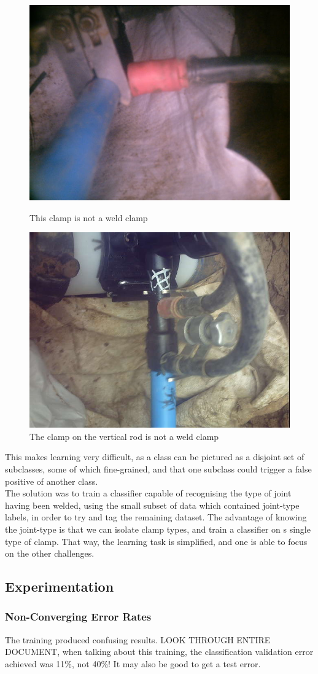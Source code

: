 \documentclass[a4paper,11pt]{article}
\begin{document}
\begin{figure}[h!]
	\centering
	\includegraphics[width=0.35\linewidth]{images/truly_confusing_1.jpg}
	\caption{This clamp is not a weld clamp}
	\includegraphics[width=0.35\linewidth]{images/truly_confusing_2.jpg}
	\caption{The clamp on the vertical rod is not a weld clamp}
\end{figure}

This makes learning very difficult, as a class can be pictured as a disjoint set of subclasses, some of which fine-grained, and that one subclass could trigger a false positive of another class.\\

The solution was to train a classifier capable of recognising the type of joint having been welded, using the small subset of data which contained joint-type labels, in order to try and tag the remaining dataset. The advantage of knowing the joint-type is that we can isolate clamp types, and train a classifier on s single type of clamp. That way, the learning task is simplified, and one is able to focus on the other challenges. \\


\subsection{Experimentation}

\subsubsection{Non-Converging Error Rates}

The training produced confusing results. LOOK THROUGH ENTIRE DOCUMENT, when talking about this training, the classification validation error achieved was 11\%, not 40\%! It may also be good to get a test error.
\end{document}

